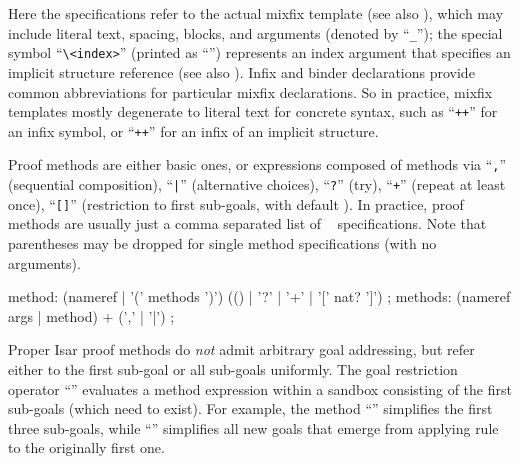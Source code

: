 \begin{isabellebody}
\begin{isamarkuptext}
  Here the  specifications refer to the actual mixfix
  template (see also \cite{isabelle-ref}), which may include literal
  text, spacing, blocks, and arguments (denoted by ``\verb|_|'');
  the special symbol ``\verb|\<index>|'' (printed as ``\isa{{\isasymindex}}'')
  represents an index argument that specifies an implicit structure
  reference (see also ).  Infix and binder
  declarations provide common abbreviations for particular mixfix
  declarations.  So in practice, mixfix templates mostly degenerate to
  literal text for concrete syntax, such as ``\verb|++|'' for
  an infix symbol, or ``\verb|++|\isa{{\isasymindex}}'' for an infix of
  an implicit structure.%
\end{isamarkuptext}%
\isamarkuptrue%
%
\isamarkuptrue%
%
\begin{isamarkuptext}%
Proof methods are either basic ones, or expressions composed of
  methods via ``\verb|,|'' (sequential composition),
  ``\verb||\verb,|,\verb||'' (alternative choices), ``\verb|?|'' 
  (try), ``\verb|+|'' (repeat at least once), ``\verb|[|\verb|]|'' (restriction to first 
  sub-goals, with default ).  In practice, proof
  methods are usually just a comma separated list of
  ~ specifications.  Note that
  parentheses may be dropped for single method specifications (with no
  arguments).

  \begin{rail}
    method: (nameref | '(' methods ')') (() | '?' | '+' | '[' nat? ']')
    ;
    methods: (nameref args | method) + (',' | '|')
    ;
  \end{rail}

  Proper Isar proof methods do \emph{not} admit arbitrary goal
  addressing, but refer either to the first sub-goal or all sub-goals
  uniformly.  The goal restriction operator ``''
  evaluates a method expression within a sandbox consisting of the
  first  sub-goals (which need to exist).  For example, the
  method ``'' simplifies the first three
  sub-goals, while ``'' simplifies all
  new goals that emerge from applying rule  to the
  originally first one.


\end{isamarkuptext}
\end{isabellebody}
